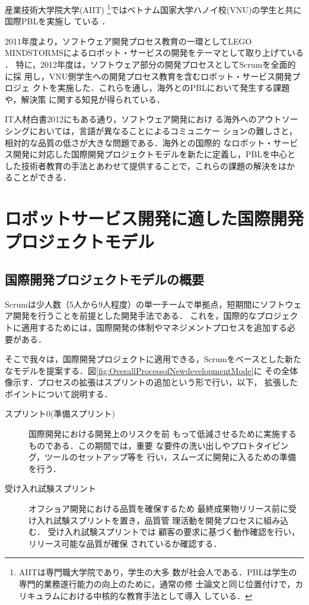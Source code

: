 \documentclass[a4j, 12Q, twocolumn, twoside]{jsarticle}
\begin{document}
産業技術大学院大学(AIIT) \footnote{AIITは専門職大学院であり，学生の大多
数が社会人である．PBLは学生の専門的業務遂行能力の向上のために，通常の修
士論文と同じ位置付けで，カリキュラムにおける中核的な教育手法として導入
している．}ではベトナム国家大学ハノイ校(VNU)の学生と共に国際PBLを実施し
ている
\cite{pub:tozawa-global-2009,大類優子2009n,nishino2010,木崎2011チケット駆動}
．


%
2011年度より，ソフトウェア開発プロセス教育の一環としてLEGO
MINDSTORMSによるロボット・サービスの開発をテーマとして取り上げている
\cite{木崎悟2012国際}
．
%
特に，2012年度は，ソフトウェア部分の開発プロセスとしてScrumを全面的に採
用し，VNU側学生への開発プロセス教育を含むロボット・サービス開発プロジェ
クトを実施した．これらを通し，海外とのPBLにおいて発生する課題や，解決策
に関する知見が得られている．

IT人材白書2012\cite{IT人材白書2012}にもある通り，ソフトウェア開発におけ
る海外へのアウトソーシングにおいては，言語が異なることによるコミュニケー
ションの難しさと，相対的な品質の低さが大きな問題である．海外との国際的
なロボット・サービス開発に対応した国際開発プロジェクトモデルを新たに定義し，PBLを中心と
した技術者教育の手法とあわせて提供することで，これらの課題の解決をはか
ることができる．



\section{ロボットサービス開発に適した国際開発プロジェクトモデル}\label{sec:model}
\subsection{国際開発プロジェクトモデルの概要}

Scrumは少人数（5人から9人程度）の単一チームで単拠点，短期間にソフトウェ
ア開発を行うことを前提とした開発手法である． これを，国際的なプロジェク
トに適用するためには，国際開発の体制やマネジメントプロセスを追加する必
要がある．

そこで我々は，国際開発プロジェクトに適用できる，Scrumをベースとした新た
なモデルを提案する．図\ref{fig:OverallProcessofNewdevelopmentMode}に
その全体像示す．プロセスの拡張はスプリントの追加という形で行い，以下，
拡張したポイントについて説明する．

\begin{description}
 \item[スプリント0(準備スプリント)] 国際開発における開発上のリスクを前
	    もって低減させるために実施するものである．この期間では，重要
	    な要件の洗い出しやプロトタイピング，ツールのセットアップ等を
	    行い，スムーズに開発に入るための準備を行う．
 \item[受け入れ試験スプリント] オフショア開発における品質を確保するため
	    最終成果物リリース前に受け入れ試験スプリントを置き，品質管
	    理活動を開発プロセスに組み込む． 受け入れ試験スプリントでは
	    顧客の要求に基づく動作確認を行い，リリース可能な品質が確保
	    されているか確認する．
\end{description}
\end{document}

